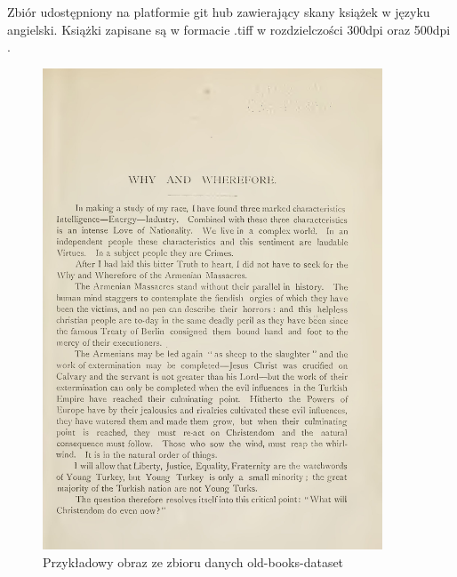 Zbiór udostępniony na platformie git hub zawierający skany książek w języku angielski.
Książki zapisane są w formacie .tiff w rozdzielczości 300dpi oraz 500dpi \cite{pedrobarcha2024}.

\begin{figure}[H]
    \centering
    \includegraphics[width=0.9\textwidth]{images/a013.jpg}
    \caption{Przykładowy obraz ze zbioru danych old-books-dataset}\label{fig:example_old_books}
\end{figure}
